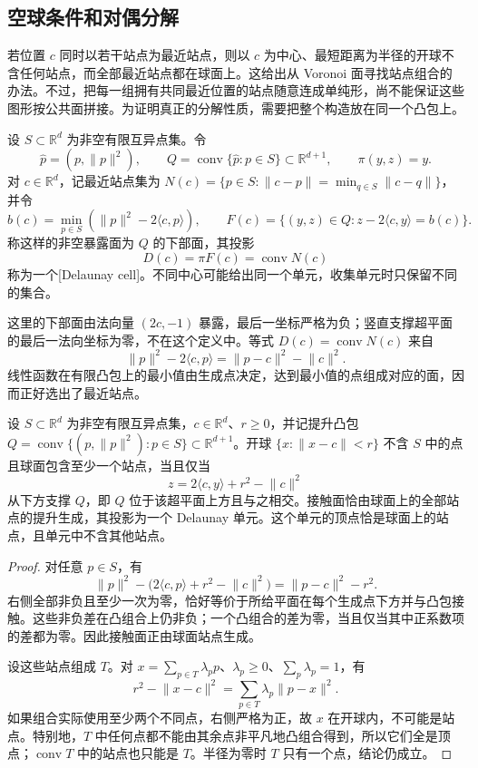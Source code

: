 \subsection{空球条件和对偶分解}
\label{g1:subsec:B02:02}

若位置 \(c\) 同时以若干站点为最近站点，则以 \(c\) 为中心、最短距离为半径的开球不含任何站点，而全部最近站点都在球面上。这给出从 Voronoi 面寻找站点组合的办法。不过，把每一组拥有共同最近位置的站点随意连成单纯形，尚不能保证这些图形按公共面拼接。为证明真正的分解性质，需要把整个构造放在同一个凸包上。

\begin{definition}\label{g1:def:delaunay-lift}
	设 \(S\subset\mathbb R^d\) 为非空有限互异点集。令
	\[
		\widehat p=(p,\lVert p\rVert^2),\qquad
		Q=\operatorname{conv}\{\widehat p:p\in S\}\subset\mathbb R^{d+1},
		\qquad \pi(y,z)=y.
	\]
	对 \(c\in\mathbb R^d\)，记最近站点集为 \(N(c)=\{p\in S:\lVert c-p\rVert=\min_{q\in S}\lVert c-q\rVert\}\)，并令
	\[
		b(c)=\min_{p\in S}(\lVert p\rVert^2-2\langle c,p\rangle),
		\qquad
		F(c)=\{(y,z)\in Q:z-2\langle c,y\rangle=b(c)\}.
	\]
	称这样的非空暴露面为 \(Q\) 的下部面，其投影
	\[
		D(c)=\pi F(c)=\operatorname{conv}N(c)
	\]
	称为一个[Delaunay cell]。不同中心可能给出同一个单元，收集单元时只保留不同的集合。
\end{definition}

这里的下部面由法向量 \((2c,-1)\) 暴露，最后一坐标严格为负；竖直支撑超平面的最后一法向坐标为零，不在这个定义中。等式 \(D(c)=\operatorname{conv}N(c)\) 来自
\[
	\lVert p\rVert^2-2\langle c,p\rangle
	=\lVert p-c\rVert^2-\lVert c\rVert^2.
\]
线性函数在有限凸包上的最小值由生成点决定，达到最小值的点组成对应的面，因而正好选出了最近站点。

\begin{proposition}\label{g1:prop:empty-sphere-lift}
	设 \(S\subset\mathbb R^d\) 为非空有限互异点集，\(c\in\mathbb R^d\)、\(r\ge0\)，并记提升凸包 \(Q=\operatorname{conv}\{(p,\lVert p\rVert^2):p\in S\}\subset\mathbb R^{d+1}\)。开球 \(\{x:\lVert x-c\rVert<r\}\) 不含 \(S\) 中的点且球面包含至少一个站点，当且仅当
	\[
		z=2\langle c,y\rangle+r^2-\lVert c\rVert^2
	\]
	从下方支撑 \(Q\)，即 \(Q\) 位于该超平面上方且与之相交。接触面恰由球面上的全部站点的提升生成，其投影为一个 Delaunay 单元。这个单元的顶点恰是球面上的站点，且单元中不含其他站点。
\end{proposition}
\begin{proof}
	对任意 \(p\in S\)，有
	\[
		\lVert p\rVert^2-\bigl(2\langle c,p\rangle+r^2-\lVert c\rVert^2\bigr)
		=\lVert p-c\rVert^2-r^2.
	\]
	右侧全部非负且至少一次为零，恰好等价于所给平面在每个生成点下方并与凸包接触。这些非负差在凸组合上仍非负；一个凸组合的差为零，当且仅当其中正系数项的差都为零。因此接触面正由球面站点生成。

	设这些站点组成 \(T\)。对 \(x=\sum_{p\in T}\lambda_pp\)、\(\lambda_p\ge0\)、\(\sum_p\lambda_p=1\)，有
	\[
		r^2-\lVert x-c\rVert^2
		=\sum_{p\in T}\lambda_p\lVert p-x\rVert^2.
	\]
	如果组合实际使用至少两个不同点，右侧严格为正，故 \(x\) 在开球内，不可能是站点。特别地，\(T\) 中任何点都不能由其余点非平凡地凸组合得到，所以它们全是顶点；\(\operatorname{conv}T\) 中的站点也只能是 \(T\)。半径为零时 \(T\) 只有一个点，结论仍成立。
\end{proof}

